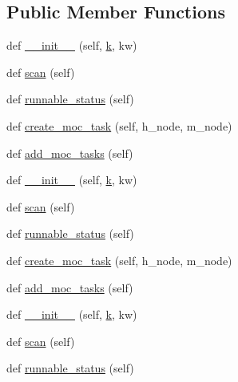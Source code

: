 \subsection*{Public Member Functions}
\begin{DoxyCompactItemize}
\item 
def \hyperlink{classwaflib_1_1_tools_1_1qt4_1_1qxx_a7bc6ffa8a31c2b612eb2fac82ab4c052}{\+\_\+\+\_\+init\+\_\+\+\_\+} (self, \hyperlink{rfft2d_test_m_l_8m_adc468c70fb574ebd07287b38d0d0676d}{k}, kw)
\item 
def \hyperlink{classwaflib_1_1_tools_1_1qt4_1_1qxx_acdd5c674e2585b425a25735b665eeb14}{scan} (self)
\item 
def \hyperlink{classwaflib_1_1_tools_1_1qt4_1_1qxx_aa3fd0759668664632f019ae7c118406d}{runnable\+\_\+status} (self)
\item 
def \hyperlink{classwaflib_1_1_tools_1_1qt4_1_1qxx_aff019276ea1c24be0da32fb4a6d3da06}{create\+\_\+moc\+\_\+task} (self, h\+\_\+node, m\+\_\+node)
\item 
def \hyperlink{classwaflib_1_1_tools_1_1qt4_1_1qxx_aec5aad1a23675343a8b270b0e8c15b0c}{add\+\_\+moc\+\_\+tasks} (self)
\item 
def \hyperlink{classwaflib_1_1_tools_1_1qt4_1_1qxx_a7bc6ffa8a31c2b612eb2fac82ab4c052}{\+\_\+\+\_\+init\+\_\+\+\_\+} (self, \hyperlink{rfft2d_test_m_l_8m_adc468c70fb574ebd07287b38d0d0676d}{k}, kw)
\item 
def \hyperlink{classwaflib_1_1_tools_1_1qt4_1_1qxx_acdd5c674e2585b425a25735b665eeb14}{scan} (self)
\item 
def \hyperlink{classwaflib_1_1_tools_1_1qt4_1_1qxx_aa3fd0759668664632f019ae7c118406d}{runnable\+\_\+status} (self)
\item 
def \hyperlink{classwaflib_1_1_tools_1_1qt4_1_1qxx_aff019276ea1c24be0da32fb4a6d3da06}{create\+\_\+moc\+\_\+task} (self, h\+\_\+node, m\+\_\+node)
\item 
def \hyperlink{classwaflib_1_1_tools_1_1qt4_1_1qxx_aec5aad1a23675343a8b270b0e8c15b0c}{add\+\_\+moc\+\_\+tasks} (self)
\item 
def \hyperlink{classwaflib_1_1_tools_1_1qt4_1_1qxx_a7bc6ffa8a31c2b612eb2fac82ab4c052}{\+\_\+\+\_\+init\+\_\+\+\_\+} (self, \hyperlink{rfft2d_test_m_l_8m_adc468c70fb574ebd07287b38d0d0676d}{k}, kw)
\item 
def \hyperlink{classwaflib_1_1_tools_1_1qt4_1_1qxx_acdd5c674e2585b425a25735b665eeb14}{scan} (self)
\item 
def \hyperlink{classwaflib_1_1_tools_1_1qt4_1_1qxx_aa3fd0759668664632f019ae7c118406d}{runnable\+\_\+status} (self)

\end{DoxyCompactItemize}

